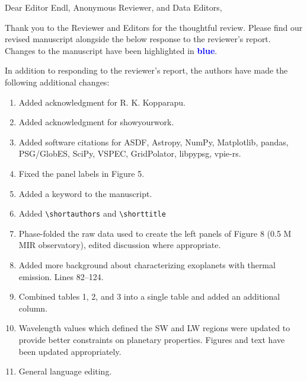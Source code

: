 \documentclass{letter}
\begin{document}
\begin{letter}{}
    \opening{Dear Editor Endl, Anonymous Reviewer, and Data Editors,}

    Thank you to the Reviewer and Editors for the thoughtful review. Please find our revised manuscript alongside the below response to the reviewer's report. Changes to the manuscript have been highlighted in \textcolor{blue}{\bf blue}.

    In addition to responding to the reviewer's report, the authors have made the following additional changes:
    
    \begin{enumerate}
        \item Added acknowledgment for R. K. Kopparapu.
        \item Added acknowledgment for showyourwork.
        \item Added software citations for ASDF, Astropy, NumPy, Matplotlib, pandas, PSG/GlobES, SciPy, VSPEC, GridPolator, libpypsg, vpie-rs.
        \item Fixed the panel labels in Figure 5.
        \item Added a keyword to the manuscript.
        \item Added \verb|\shortauthors| and \verb|\shorttitle|
        \item Phase-folded the raw data used to create the left panels of Figure 8 (0.5 M MIR observatory), edited discussion where appropriate.
        \item Added more background about characterizing exoplanets with thermal emission. Lines 82--124.
        \item Combined tables 1, 2, and 3 into a single table and added an additional column.
        \item Wavelength values which defined the SW and LW regions were updated to provide better constraints on planetary properties. Figures and text have been updated appropriately.
        \item General language editing.
    \end{enumerate}
    

\end{letter}
\end{document}
